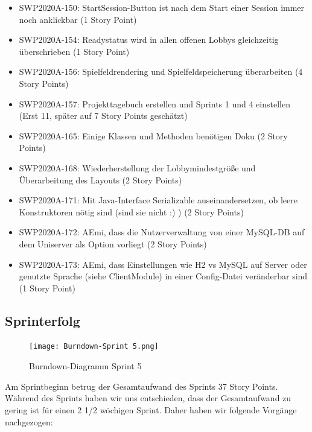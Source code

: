 \documentclass[12pt,a4paper, oneside]{article}
\begin{document}
\begin{itemize}
        \item SWP2020A-150: StartSession-Button ist nach dem Start einer Session immer noch anklickbar (1 Story Point)

        \item SWP2020A-154: Readystatus wird in allen offenen Lobbys gleichzeitig überschrieben    (1 Story Point)

        \item SWP2020A-156: Spielfeldrendering und Spielfeldspeicherung überarbeiten (4 Story Points)

        \item SWP2020A-157: Projekttagebuch erstellen und Sprints 1 und 4 einstellen (Erst 11, später auf 7 Story Points geschätzt)

        \item SWP2020A-165: Einige Klassen und Methoden benötigen Doku (2 Story Points)

        \item SWP2020A-168: Wiederherstellung der Lobbymindestgröße und Überarbeitung des Layouts (2 Story Points)

        \item SWP2020A-171: Mit Java-Interface Serializable auseinandersetzen, ob leere Konstruktoren nötig sind (sind sie nicht :) )    (2 Story Points)

        \item SWP2020A-172: AEmi, dass die Nutzerverwaltung von einer MySQL-DB auf dem Uniserver als Option vorliegt (2 Story Points)

        \item SWP2020A-173: AEmi, dass Einstellungen wie H2 vs MySQL auf Server oder genutzte Sprache (siehe ClientModule) in einer Config-Datei veränderbar sind (1 Story Point)

    \end{itemize}

    \subsection{Sprinterfolg}

    \begin{figure}[h]
        \centering
        \texttt{[image: Burndown-Sprint 5.png]}
        \caption{Burndown-Diagramm Sprint 5}
        \label{fig: Burndown-Sprint5}
    \end{figure}

    \noindent
    Am Sprintbeginn betrug der Gesamtaufwand des Sprints 37 Story Points. Während des Sprints haben wir uns entschieden, dass der Gesamtaufwand zu gering ist für einen 2 1/2 wöchigen Sprint. Daher haben wir folgende Vorgänge nachgezogen:
\end{document}
